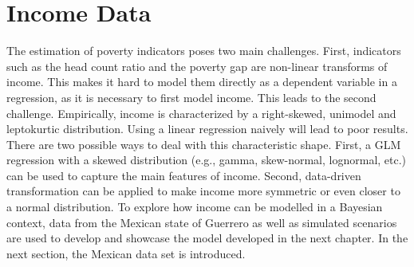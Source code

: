 \chapter{Income Data}

The estimation of poverty indicators poses two main challenges.
First, indicators such as the head count ratio and the poverty gap are non-linear transforms of income.
This makes it hard to model them directly as a dependent variable in a regression, as it is necessary to first model income.
This leads to the second challenge.
Empirically, income is characterized by a right-skewed, unimodel and leptokurtic distribution.
Using a linear regression naively will lead to poor results.
There are two possible ways to deal with this characteristic shape.
First, a GLM regression with a skewed distribution (e.g., gamma, skew-normal, lognormal, etc.) can be used to capture the main features of income.
Second, data-driven transformation can be applied to make income more symmetric or even closer to a normal distribution.
To explore how income can be modelled in a Bayesian context, data from the Mexican state of Guerrero as well as simulated scenarios are used to develop and showcase the model developed in the next chapter.
In the next section, the Mexican data set is introduced.


